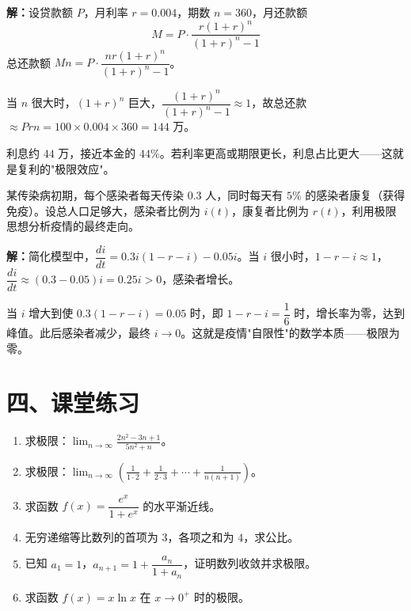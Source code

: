 \documentclass[12pt, a4paper]{ctexart}
\begin{document}
\textbf{解：}设贷款额 $P$，月利率 $r = 0.004$，期数 $n = 360$，月还款额
\[
M = P \cdot \frac{r(1+r)^n}{(1+r)^n - 1}
\]
总还款额 $Mn = P \cdot \dfrac{nr(1+r)^n}{(1+r)^n - 1}$。

当 $n$ 很大时，$(1+r)^n$ 巨大，$\dfrac{(1+r)^n}{(1+r)^n - 1} \approx 1$，故总还款 $\approx Prn = 100 \times 0.004 \times 360 = 144$ 万。

利息约 $44$ 万，接近本金的 $44\%$。若利率更高或期限更长，利息占比更大——这就是复利的"极限效应"。

\begin{appbox}
某传染病初期，每个感染者每天传染 $0.3$ 人，同时每天有 $5\%$ 的感染者康复（获得免疫）。设总人口足够大，感染者比例为 $i(t)$，康复者比例为 $r(t)$，利用极限思想分析疫情的最终走向。
\end{appbox}

\textbf{解：}简化模型中，$\dfrac{di}{dt} = 0.3i(1-r-i) - 0.05i$。当 $i$ 很小时，$1 - r - i \approx 1$，$\dfrac{di}{dt} \approx (0.3 - 0.05)i = 0.25i > 0$，感染者增长。

当 $i$ 增大到使 $0.3(1-r-i) = 0.05$ 时，即 $1 - r - i = \dfrac{1}{6}$ 时，增长率为零，达到峰值。此后感染者减少，最终 $i \to 0$。这就是疫情"自限性"的数学本质——极限为零。

\section*{\textcolor{tipgreen}{四、课堂练习}}

\begin{enumerate}[leftmargin=2em]
  \item 求极限：$\displaystyle\lim_{n \to \infty} \frac{2n^2 - 3n + 1}{5n^2 + n}$。

  \item 求极限：$\displaystyle\lim_{n \to \infty} \left(\frac{1}{1 \cdot 2} + \frac{1}{2 \cdot 3} + \cdots + \frac{1}{n(n+1)}\right)$。

  \item 求函数 $f(x) = \dfrac{e^x}{1 + e^x}$ 的水平渐近线。

  \item 无穷递缩等比数列的首项为 $3$，各项之和为 $4$，求公比。

  \item 已知 $a_1 = 1$，$a_{n+1} = 1 + \dfrac{a_n}{1 + a_n}$，证明数列收敛并求极限。

  \item 求函数 $f(x) = x \ln x$ 在 $x \to 0^+$ 时的极限。
\end{enumerate}
\end{document}
